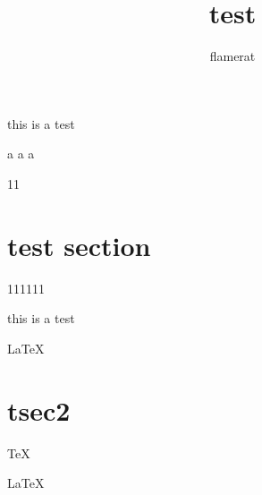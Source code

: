 \documentclass{article}
\author{flamerat}
\title{test}
\begin{document}
 \maketitle
 
 this is a test
 
 a \qquad a \qquad a
 
 11  
 
 \section{test section}
 
  111111
  
  this is a test
  
  \LaTeX
  
 \section{tsec2}
  
  \TeX
  
  \Large \LaTeX

 
 
\end{document}
